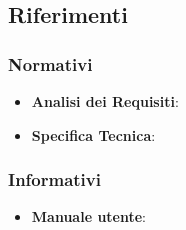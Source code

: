 	\subsection{Riferimenti} %
	\label{sub:riferimenti}


		\subsubsection{Normativi} %
		\label{ssub:normativi}
			\begin{itemize}
				\item \textbf{Analisi dei Requisiti}: \docNameVersionAdR
				\item \textbf{Specifica Tecnica}: \docNameVersionST
			\end{itemize}


		\subsubsection{Informativi} %
		\label{ssub:informativi}
			\begin{itemize}
				\item \textbf{Manuale utente}: \docNameVersionMU
			\end{itemize}



